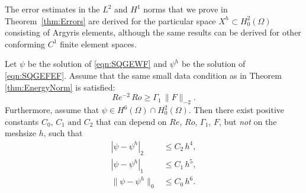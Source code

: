 The error estimates in the $L^2$ and $H^1$ norms that we prove in
Theorem~\ref{thm:Errors} are derived for the particular space $X^h\subset
H^2_0(\Omega)$ consisting of Argyris elements, although the same results can be
derived for other conforming $C^1$ finite element spaces.
\begin{thm} \label{thm:Errors}
  Let $\psi$ be the solution of \eqref{eqn:SQGEWF} and $\psi^h$ be the solution
  of \eqref{eqn:SQGEFEF}.  Assume that the same small data condition as in
  Theorem \ref{thm:EnergyNorm} is satisfied:
  \begin{equation}
    Re^{-2} \, Ro \geq \Gamma_1 \, \| F \|_{-2} .
    \label{eqn:small_data_condition_dual}
  \end{equation}
  Furthermore, assume that $\psi\in H^6(\Omega) \cap H^2_0(\Omega)$.  Then there
  exist positive constants $C_0, \, C_1 \text{ and } C_2$ that can depend on
  $Re$, $Ro$, $\Gamma_1$, $F$, but \emph{not} on the meshsize $h$, such that
  \begin{align}
    |\psi - \psi^h|_2 &\le C_2 \, h^4 , \label{eqn:H2Error} \\
    |\psi - \psi^h|_1 &\le C_1 \, h^5 , \label{eqn:H1Error} \\
    \|\psi - \psi^h\|_0 &\le C_0 \, h^6 . \label{eqn:L2Error}
  \end{align}
\end{thm}
